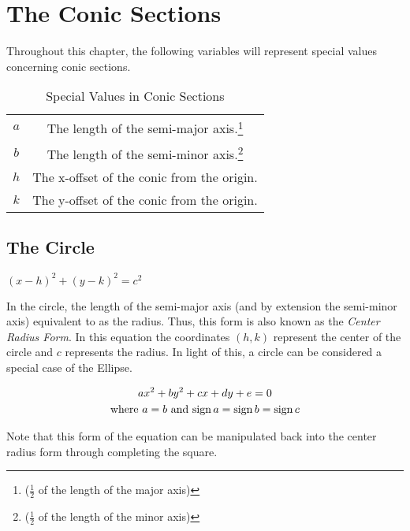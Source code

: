 \chapter{The Conic Sections}
Throughout this chapter, the following variables will represent special values concerning conic sections.
\begin{table}[H]
\caption{Special Values in Conic Sections}
\centering
\begin{tabular}{c c}
\hline
$a$ & The length of the semi-major axis.\footnote{($\frac{1}{2}$ of the length of the major axis)}\\
$b$ & The length of the semi-minor axis.\footnote{($\frac{1}{2}$ of the length of the minor axis)}\\
$h$ & The x-offset of the conic from the origin.\\
$k$ & The y-offset of the conic from the origin.\\

\hline
\end{tabular}
\label{table:SpecValsConics}
\end{table}

\section{The Circle}
\begin{defn}
$\displaystyle{(x-h)^{2}+(y-k)^{2}=c^{2}}$
\end{defn}
In the circle, the length of the semi-major axis (and by extension the semi-minor axis) equivalent to as the radius. Thus, this form is also known as the \emph{Center Radius Form}. In this equation the coordinates $(h,k)$ represent the center of the circle and $c$ represents the radius. In light of this, a circle can be considered a special case of the Ellipse.

\begin{defn}
\begin{gather*}
\displaystyle{ax^{2}+by^{2}+cx+dy+e=0}\\
\text{where $a=b$ and $\operatorname{sign}{a}=\operatorname{sign}{b}=\operatorname{sign}{c}$}
\end{gather*}
\end{defn}
Note that this form of the equation can be manipulated back into the center radius form through completing the square.

